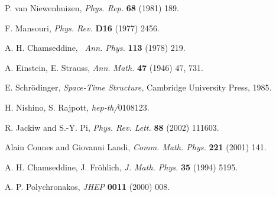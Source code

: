 \documentclass[a4paper,a4paper]{article}
\begin{document}
\begin{thebibliography}{99}
P. van Niewenhuizen, \textit{Phys. Rep. }\textbf{68
}(1981) 189.

F. Mansouri, \textit{Phys. Rev. }\textbf{D16 }(1977) 2456.

A. H. Chamseddine, \textit{\ Ann. Phys. }\textbf{113 }(1978) 219.

A. Einstein, E. Strauss, \textit{Ann. Math. }\textbf{47 }(1946)
47, 731.

E. Schr\"{o}dinger, \textit{Space-Time Structure, }Cambridge
University Press, 1985.

H. Nishino, S. Rajpott, \textit{hep-th/}0108123.

R. Jackiw and S.-Y. Pi, \textit{Phys. Rev. Lett. }\textbf{88
}(2002) 111603.

Alain Connes and Giovanni Landi, \textit{Comm. Math. Phys.
}\textbf{221 }(2001) 141.

A. H. Chamseddine, J. Fr\"{o}hlich, \textit{J. Math. Phys.
}\textbf{35} (1994) 5195.

A. P. Polychronakos, \textit{JHEP }\textbf{0011 }(2000) 008.
\end{thebibliography}
\end{document}
